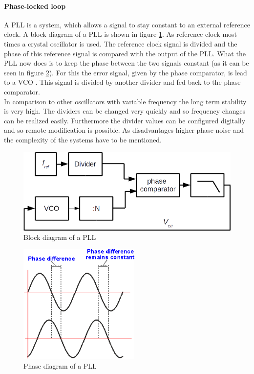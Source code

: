 \paragraph{Phase-locked loop\\}
A PLL is a system, which allows a signal to stay constant to an external reference clock. A block diagram of a PLL is shown in figure \ref{fig:pllblocks}. As reference clock most times a crystal oscillator is used. The reference clock signal is divided and the phase of this reference signal is compared with the output of the PLL. What the PLL now does is to keep the phase between the two signals constant (as it can be seen in figure \ref{fig:pllphase}). For this the error signal, given by the phase comparator, is lead to a VCO . This signal is divided by another divider and fed back to the phase comparator.\\
In comparison to other oscillators with variable frequency the long term stability is very high. The dividers can be changed very quickly and so frequency changes can be realized easily. Furthermore the divider values can be configured digitally and so remote modification is possible. As disadvantages higher phase noise and the complexity of the systems have to be mentioned.
\begin{figure}[htbp]
\begin{center}
\includegraphics[width=12cm,keepaspectratio=true]{bilder/png/PLLblocks}
\caption{Block diagram of a PLL}
\label{fig:pllblocks}
\end{center}
\end{figure}
\begin{figure}[htbp]
\begin{center}
\includegraphics[width=6cm,keepaspectratio=true]{bilder/png/PLLphase}
\caption{Phase diagram of a PLL}
\label{fig:pllphase}
\end{center}
\end{figure}
